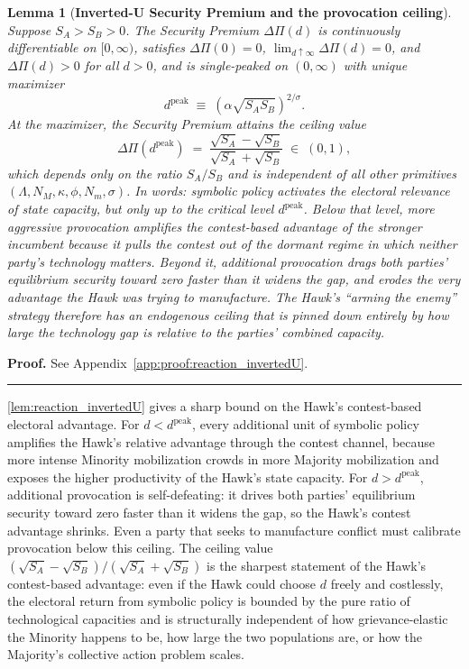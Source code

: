 \documentclass[11pt,twoside]{extarticle}
\newtheorem{lemma}{Lemma}
\newenvironment{proof}[1][Proof]{\noindent \textbf{#1.} }{\ \rule{0.5em}{0.5em}}
\begin{document}
\begin{lemma}[\textbf{Inverted-U Security Premium and the provocation ceiling}] \label{lem:reaction_invertedU}
Suppose $S_A>S_B>0$. The Security Premium $\Delta\Pi(d)$ is continuously differentiable on $[0,\infty)$, satisfies $\Delta\Pi(0)=0$, $\lim_{d\uparrow\infty}\Delta\Pi(d)=0$, and $\Delta\Pi(d)>0$ for all $d>0$, and is single-peaked on $(0,\infty)$ with unique maximizer
\begin{equation} \label{eq:d_peak}
d^{\mathrm{peak}}\;\equiv\;(\alpha\sqrt{S_A S_B})^{2/\sigma}.
\end{equation}
At the maximizer, the Security Premium attains the ceiling value
\begin{equation} \label{eq:DPi_peak}
\Delta\Pi(d^{\mathrm{peak}})\;=\;\frac{\sqrt{S_A}-\sqrt{S_B}}{\sqrt{S_A}+\sqrt{S_B}}\;\in\;(0,1),
\end{equation}
which depends only on the ratio $S_A/S_B$ and is independent of all other primitives $(\Lambda,N_M,\kappa,\phi,N_m,\sigma)$. In words: symbolic policy activates the electoral relevance of state capacity, but only up to the critical level $d^{\mathrm{peak}}$. Below that level, more aggressive provocation amplifies the contest-based advantage of the stronger incumbent because it pulls the contest out of the dormant regime in which neither party's technology matters. Beyond it, additional provocation drags both parties' equilibrium security toward zero faster than it widens the gap, and erodes the very advantage the Hawk was trying to manufacture. The Hawk's ``arming the enemy'' strategy therefore has an endogenous ceiling that is pinned down entirely by how large the technology gap is relative to the parties' combined capacity.
\end{lemma}

\begin{proof}
See Appendix~\autoref{app:proof:reaction_invertedU}.
\end{proof}

\autoref{lem:reaction_invertedU} gives a sharp bound on the Hawk's contest-based electoral advantage. For $d<d^{\mathrm{peak}}$, every additional unit of symbolic policy amplifies the Hawk's relative advantage through the contest channel, because more intense Minority mobilization crowds in more Majority mobilization and exposes the higher productivity of the Hawk's state capacity. For $d>d^{\mathrm{peak}}$, additional provocation is self-defeating: it drives both parties' equilibrium security toward zero faster than it widens the gap, so the Hawk's contest advantage shrinks. Even a party that seeks to manufacture conflict must calibrate provocation below this ceiling. The ceiling value $(\sqrt{S_A}-\sqrt{S_B})/(\sqrt{S_A}+\sqrt{S_B})$ is the sharpest statement of the Hawk's contest-based advantage: even if the Hawk could choose $d$ freely and costlessly, the electoral return from symbolic policy is bounded by the pure ratio of technological capacities and is structurally independent of how grievance-elastic the Minority happens to be, how large the two populations are, or how the Majority's collective action problem scales.
\end{document}
